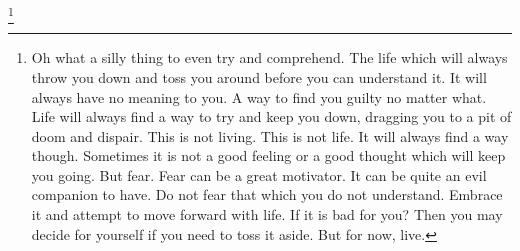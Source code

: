 \footnote{
Oh what a silly thing to even try and comprehend. The life which will always
throw you down and toss you around before you can understand it. It will always
have no meaning to you. A way to find you guilty no matter what. Life will
always find a way to try and keep you down, dragging you to a pit of doom and
dispair. This is not living. This is not life. It will always find a way though.
Sometimes it is not a good feeling or a good thought which will keep you going.
But fear. Fear can be a great motivator. It can be quite an evil companion to
have. Do not fear that which you do not understand. Embrace it and attempt to
move forward with life. If it is bad for you? Then you may decide for yourself
if you need to toss it aside. But for now, live.
}